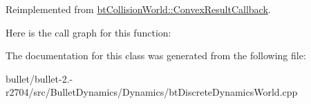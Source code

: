 Reimplemented from \hyperlink{structbt_collision_world_1_1_convex_result_callback}{bt\+Collision\+World\+::\+Convex\+Result\+Callback}.



Here is the call graph for this function\+:




The documentation for this class was generated from the following file\+:\begin{DoxyCompactItemize}
\item 
bullet/bullet-\/2.-\/r2704/src/\+Bullet\+Dynamics/\+Dynamics/bt\+Discrete\+Dynamics\+World.\+cpp\end{DoxyCompactItemize}
